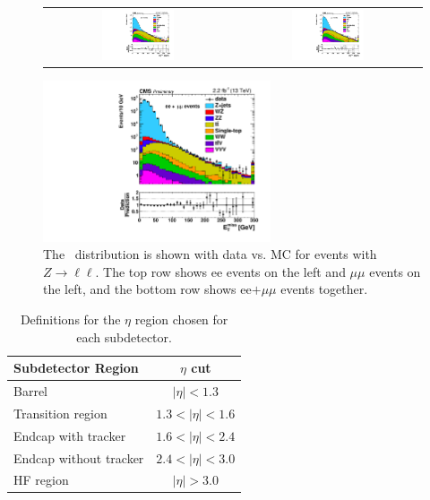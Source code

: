 \begin{figure}[!ht]
\begin{center}
\begin{tabular}{cc}
\includegraphics[width=0.4\textwidth]{MET/figs/h_met_T1CHS_pt_ee_inclusive_passtrig.pdf} &
\includegraphics[width=0.4\textwidth]{MET/figs/h_met_T1CHS_pt_mm_inclusive_passtrig.pdf} \\
\end{tabular}
\includegraphics[width=0.6\textwidth]{MET/figs/h_met_T1CHS_pt_ll_inclusive_passtrig.pdf}
\caption{The \MET\ distribution is shown with data vs. MC for events with $Z\rightarrow\ell\ell$.
The top row shows ee events on the left and $\mu\mu$ events on the left,
and the bottom row shows ee$+\mu\mu$ events together.
\label{fig:T1MET_datavsmc}
}
\end{center}
\end{figure}

\begin{table}[htb]
\scriptsize
\begin{center}
\caption{
Definitions for the $\eta$ region chosen for each subdetector.
\label{tab:subdetector_eta}}
\begin{tabular}{l|c}

\hline
Subdetector Region     & $\eta$ cut \\
\hline
Barrel                 & $|\eta| < 1.3$ \\
Transition region      & $1.3 < |\eta| < 1.6$ \\
Endcap with tracker    & $1.6 < |\eta| < 2.4$ \\
Endcap without tracker & $2.4 < |\eta| < 3.0$ \\
HF region              & $|\eta| > 3.0$ \\
\hline
\end{tabular}
\end{center}
\end{table}


